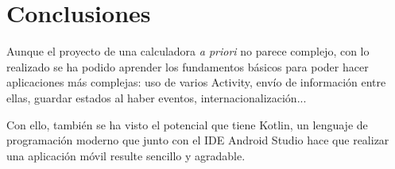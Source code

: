 \documentclass{\ClassPath/viu-tfm-template}
\begin{document}
\chapter{Conclusiones}

Aunque el proyecto de una calculadora \textit{a priori} no parece complejo, con lo realizado se ha podido aprender los fundamentos básicos para poder hacer aplicaciones más complejas: uso de varios Activity, envío de información entre ellas, guardar estados al haber eventos, internacionalización...

Con ello, también se ha visto el potencial que tiene Kotlin, un lenguaje de programación moderno que junto con el IDE Android Studio hace que realizar una aplicación móvil resulte sencillo y agradable.
\end{document}
